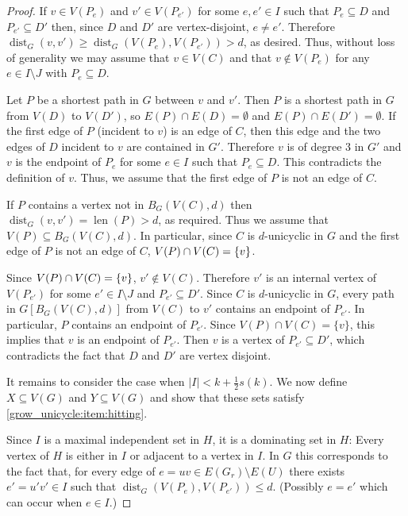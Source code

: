 \documentclass{patmorin}
\DeclareMathOperator{\len}{len}
\DeclareMathOperator{\dist}{dist}
\DeclarePairedDelimiter\set{\{}{\}}
\begin{document}
\begin{proof}
  
    If $v\in V(P_e)$ and $v'\in V(P_{e'})$ for some  $e,e' \in I$ such that $P_e\subseteq D$ and $P_{e'}\subseteq D'$ then, 
    since $D$ and $D'$ are vertex-disjoint, $e\neq e'$. Therefore 
    $\dist_G(v,v')\geq  \dist_G(V(P_e),V(P_{e'}))>d$, as desired.  Thus, without loss of generality we may assume that $v\in V(C)$ and that $v\notin V(P_e)$ for any $e\in I\setminus J$ with $P_e\subseteq D$.
    
    Let $P$ be a shortest path in $G$ between $v$ and $v'$.  Then $P$ is a shortest path in $G$ from $V(D)$ to $V(D')$, so $E(P)\cap E(D)=\emptyset$ and $E(P)\cap E(D')=\emptyset$.  If the first edge of $P$ (incident to $v$) is an edge of $C$, then this edge and the two edges of $D$ incident to $v$ are contained in $G'$. Therefore $v$ is of degree $3$ in $G'$ and $v$ is the endpoint of $P_e$ for some $e\in I$ such that $P_e\subseteq D$.  This contradicts the definition of $v$.
    Thus, we assume that the first edge of $P$ is not an edge of $C$. 
    
    If $P$ contains a vertex not in $B_G(V(C),d)$ then $\dist_G(v,v')=\len(P)>d$, as required.  Thus we assume that $V(P)\subseteq B_G(V(C),d)$.
    In particular, since $C$ is $d$-unicyclic in $G$ and the first edge of $P$ is not an edge of $C$, $V(P)\cap V(C)=\set{v}$. 
    
    Since $V(P)\cap V(C)=\set{v}$,  $v'\notin V(C)$.  Therefore $v'$ is an internal vertex of $V(P_{e'})$ for some $e'\in I\setminus J$ and $P_{e'}\subseteq D'$.  Since $C$ is $d$-unicyclic in $G$, every path in $G[B_G(V(C),d)]$ from $V(C)$ to $v'$ contains an endpoint of $P_{e'}$.  In particular, $P$ contains an endpoint of $P_{e'}$.  Since $V(P)\cap V(C)=\{v\}$, this implies that $v$ is an endpoint of $P_{e'}$.  Then $v$ is a vertex of $P_{e'}\subseteq D'$, which contradicts the fact that $D$ and $D'$ are vertex disjoint.   
    
  It remains to consider the case when $|I| < k+\frac{1}{2}s(k)$.  We now define $X\subseteq V(G)$ and $Y\subseteq V(G)$ and show that these sets satisfy \cref{grow_unicycle:item:hitting}.  
  
  Since $I$ is a maximal independent set in $H$, it is a dominating set in $H$: Every vertex of $H$ is either in $I$ or adjacent to a vertex in $I$.  In $G$ this corresponds to the fact that, for every edge of $e=uv\in E(G_r)\setminus E(U)$ there exists $e'=u'v'\in I$ such that $\dist_G(V(P_{e}),V(P_{e'}))\le d$.  (Possibly $e=e'$ which can occur when $e\in I$.)


\end{proof}
\end{document}
